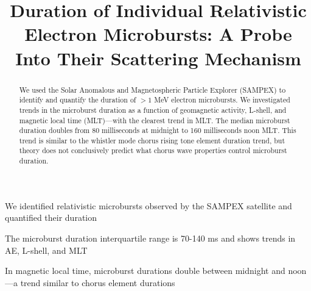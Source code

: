 \documentclass[draft]{agujournal2019}
\begin{document}
%
%



\title{Duration of Individual Relativistic Electron Microbursts: A Probe Into Their Scattering Mechanism}






\begin{keypoints}
\item We identified relativistic microbursts observed by the SAMPEX satellite and quantified their duration
\item The microburst duration interquartile range is 70-140 ms and shows trends in AE, L-shell, and MLT
\item In magnetic local time, microburst durations double between midnight and noon---a trend similar to chorus element durations
\end{keypoints}

\begin{abstract}
We used the Solar Anomalous and Magnetospheric Particle Explorer (SAMPEX) to identify and quantify the duration of $>1$ MeV electron microbursts. We investigated trends in the microburst duration as a function of geomagnetic activity, L-shell, and magnetic local time (MLT)---with the clearest trend in MLT. The median microburst duration doubles from 80 milliseconds at midnight to 160 milliseconds noon MLT. This trend is similar to the whistler mode chorus rising tone element duration trend, but theory does not conclusively predict what chorus wave properties control microburst duration.
\end{abstract}
\end{document}
